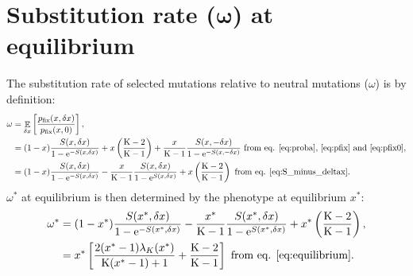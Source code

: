 \documentclass{article}
\DeclareMathOperator{\E}{\mathbb{E}}
\newcommand{\e}{\mathrm{e}}
\newcommand{\dnds}{\omega}
\newcommand{\Nstate}{\text{K}}
\newcommand{\x}{x}
\newcommand{\eq}{^{*}}
\newcommand{\dx}{\delta \x}
\begin{document}
\section*{Substitution rate ($\bm{\dnds}$) at equilibrium}
The substitution rate of selected mutations relative to neutral mutations  ($\dnds$) is by definition:
\begin{align}
\dnds & = \E_{\dx} \left[ \frac{p_{\text{fix}}(\x, \dx)}{p_{\text{fix}}(\x, 0)} \right], \\
 & = (1 - \x) \frac{ S(\x, \dx)}{1 - \e^{-S(\x, \dx)}} + \x \left(\frac{\Nstate - 2}{\Nstate - 1}\right) + \frac{\x}{\Nstate-1} \frac{ S(\x, -\dx)}{1 - \e^{-S(\x, -\dx)}} \text{ from eq. \ref{eq:proba}, \ref{eq:pfix} and \ref{eq:pfix0}}, \\
 & = (1 - \x) \frac{ S(\x, \dx)}{1 - \e^{-S(\x, \dx)}} - \frac{\x}{\Nstate-1}  \frac{ S(\x, \dx)}{1 - \e^{S(\x, \dx)}} +  \x \left(\frac{\Nstate - 2}{\Nstate - 1}\right) \text{ from eq. \ref{eq:S_minus_deltax}}.
\end{align}
$\dnds\eq$ at equilibrium is then determined by the phenotype at equilibrium $\x\eq$:
\begin{align}
\dnds\eq &= (1 - \x\eq) \frac{ S(\x\eq, \dx)}{1 - \e^{-S(\x\eq, \dx)}} - \frac{\x\eq}{\Nstate-1} \frac{ S(\x\eq, \dx)}{1 - \e^{S(\x\eq, \dx)}} + \x\eq \left(\frac{\Nstate - 2}{\Nstate - 1}\right) , \\
 &= \x\eq \left[ \frac{2 (\x\eq-1)  \lambda_{K}(\x\eq) }{\Nstate (\x\eq-1)+1} + \frac{\Nstate - 2}{\Nstate - 1}\right] \text{ from eq. \ref{eq:equilibrium}}.
\end{align}
\begin{center}
\end{center}
\end{document}

